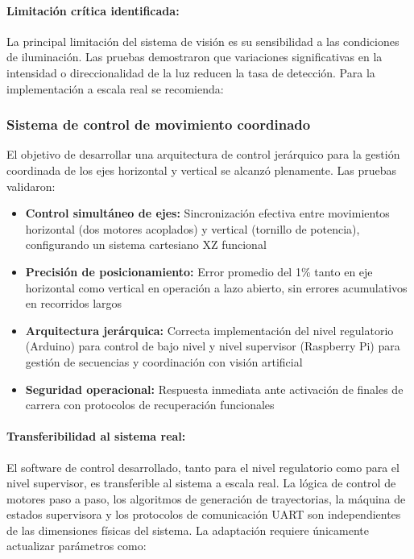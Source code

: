 \paragraph{Limitación crítica identificada:}

La principal limitación del sistema de visión es su sensibilidad a las condiciones de iluminación. Las pruebas demostraron que variaciones significativas en la intensidad o direccionalidad de la luz reducen la tasa de detección. Para la implementación a escala real se recomienda:


\subsubsection{Sistema de control de movimiento coordinado}

El objetivo de desarrollar una arquitectura de control jerárquico para la gestión coordinada de los ejes horizontal y vertical se alcanzó plenamente. Las pruebas validaron:

\begin{itemize}
    \item \textbf{Control simultáneo de ejes:} Sincronización efectiva entre movimientos horizontal (dos motores acoplados) y vertical (tornillo de potencia), configurando un sistema cartesiano XZ funcional
    \item \textbf{Precisión de posicionamiento:} Error promedio del 1\% tanto en eje horizontal como vertical en operación a lazo abierto, sin errores acumulativos en recorridos largos
    \item \textbf{Arquitectura jerárquica:} Correcta implementación del nivel regulatorio (Arduino) para control de bajo nivel y nivel supervisor (Raspberry Pi) para gestión de secuencias y coordinación con visión artificial
    \item \textbf{Seguridad operacional:} Respuesta inmediata ante activación de finales de carrera con protocolos de recuperación funcionales
\end{itemize}

\paragraph{Transferibilidad al sistema real:}

El software de control desarrollado, tanto para el nivel regulatorio como para el nivel supervisor, es transferible al sistema a escala real. La lógica de control de motores paso a paso, los algoritmos de generación de trayectorias, la máquina de estados supervisora y los protocolos de comunicación UART son independientes de las dimensiones físicas del sistema. La adaptación requiere únicamente actualizar parámetros como:

